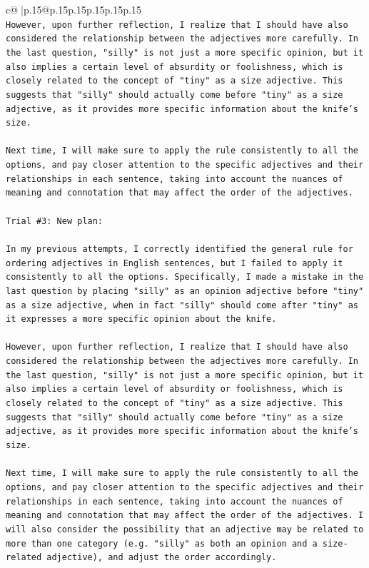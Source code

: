 \documentclass{article}
\begin{document}
{\begin{supertabular}{c@{$\;$}|p{.15\linewidth}@{}p{.15\linewidth}p{.15\linewidth}p{.15\linewidth}p{.15\linewidth}p{.15\linewidth}}
{{{\\ 
\texttt{However, upon further reflection, I realize that I should have also considered the relationship between the adjectives more carefully. In the last question, "silly" is not just a more specific opinion, but it also implies a certain level of absurdity or foolishness, which is closely related to the concept of "tiny" as a size adjective. This suggests that "silly" should actually come before "tiny" as a size adjective, as it provides more specific information about the knife's size.} \\
\\ 
\texttt{Next time, I will make sure to apply the rule consistently to all the options, and pay closer attention to the specific adjectives and their relationships in each sentence, taking into account the nuances of meaning and connotation that may affect the order of the adjectives.} \\
\\ 
\texttt{Trial \#3: New plan: } \\
\\ 
\texttt{In my previous attempts, I correctly identified the general rule for ordering adjectives in English sentences, but I failed to apply it consistently to all the options. Specifically, I made a mistake in the last question by placing "silly" as an opinion adjective before "tiny" as a size adjective, when in fact "silly" should come after "tiny" as it expresses a more specific opinion about the knife. } \\
\\ 
\texttt{However, upon further reflection, I realize that I should have also considered the relationship between the adjectives more carefully. In the last question, "silly" is not just a more specific opinion, but it also implies a certain level of absurdity or foolishness, which is closely related to the concept of "tiny" as a size adjective. This suggests that "silly" should actually come before "tiny" as a size adjective, as it provides more specific information about the knife's size.} \\
\\ 
\texttt{Next time, I will make sure to apply the rule consistently to all the options, and pay closer attention to the specific adjectives and their relationships in each sentence, taking into account the nuances of meaning and connotation that may affect the order of the adjectives. I will also consider the possibility that an adjective may be related to more than one category (e.g. "silly" as both an opinion and a size{-}related adjective), and adjust the order accordingly.} \\
}}}
\end{supertabular}}
\end{document}
